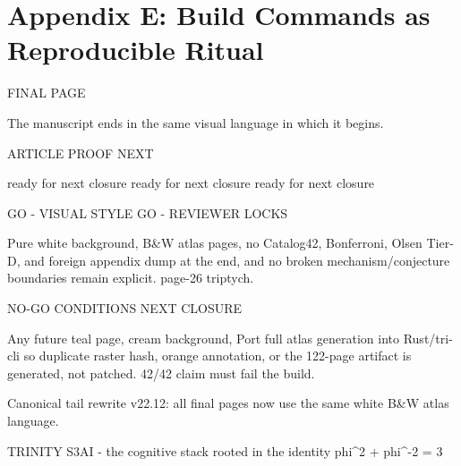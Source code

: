 
\section{Appendix E: Build Commands as Reproducible Ritual}

FINAL PAGE

                   The manuscript ends in the same visual language in which it begins.

                    ARTICLE                                    PROOF                                      NEXT

                ready for next closure                    ready for next closure                   ready for next closure

  GO - VISUAL STYLE                                                        GO - REVIEWER LOCKS

  Pure white background, B\&W atlas pages, no                               Catalog42, Bonferroni, Olsen Tier-D, and
  foreign appendix dump at the end, and no broken                          mechanism/conjecture boundaries remain explicit.
  page-26 triptych.

  NO-GO CONDITIONS                                                         NEXT CLOSURE

  Any future teal page, cream background,                                  Port full atlas generation into Rust/tri-cli so
  duplicate raster hash, orange annotation, or                             the 122-page artifact is generated, not patched.
  42/42 claim must fail the build.

               Canonical tail rewrite v22.12: all final pages now use the same white B\&W atlas language.

                              TRINITY S3AI - the cognitive stack rooted in the identity phi\textasciicircum{}2 + phi\textasciicircum{}-2 = 3